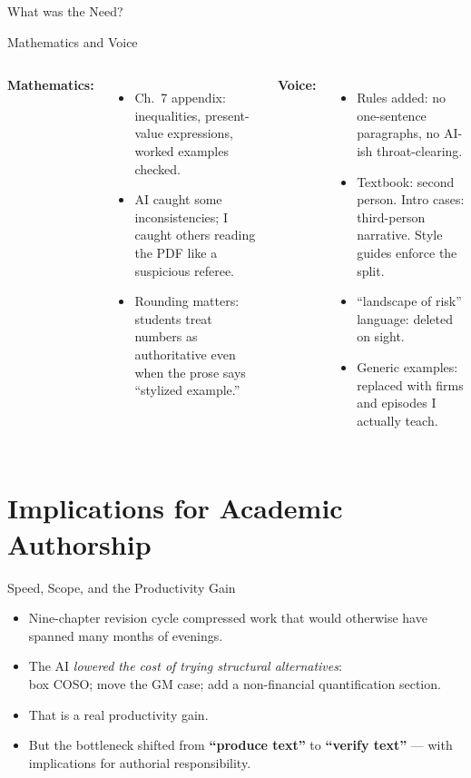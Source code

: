 \documentclass[11pt, aspectratio=169]{beamer}
\begin{document}
\begin{frame}{What was the Need?}
\begin{frame}{Mathematics and Voice}
\begin{columns}[T]
\textbf{Mathematics:}
\begin{itemize}
  \item Ch.\ 7 appendix: inequalities, present-value expressions,
        worked examples checked.
  \item AI caught some inconsistencies; I caught others reading
        the PDF like a suspicious referee.
  \item Rounding matters: students treat numbers as authoritative
        even when the prose says ``stylized example.''
\end{itemize}
\textbf{Voice:}
\begin{itemize}
  \item Rules added: no one-sentence paragraphs,
        no AI-ish throat-clearing.
  \item Textbook: second person.
        Intro cases: third-person narrative.
        Style guides enforce the split.
  \item ``landscape of risk'' language: deleted on sight.
  \item Generic examples: replaced with firms and episodes I actually teach.
\end{itemize}
\end{columns}
\end{frame}

\section{Implications for Academic Authorship}

\begin{frame}{Speed, Scope, and the Productivity Gain}
\begin{itemize}
  \item Nine-chapter revision cycle compressed work that would otherwise have
        spanned many months of evenings.
  \item The AI \emph{lowered the cost of trying structural alternatives}:\\
        box COSO; move the GM case; add a non-financial quantification section.
  \item That is a real productivity gain.
  \item But the bottleneck shifted from \textbf{``produce text''} to
        \textbf{``verify text''} --- with implications for authorial responsibility.
\end{itemize}
\end{frame}


\end{frame}
\end{document}
